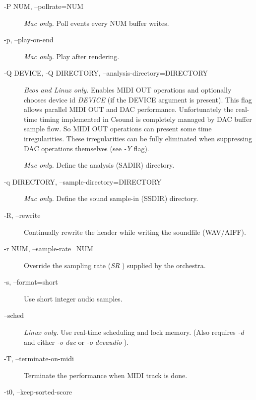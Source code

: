 \begin{description}
\item[-P NUM, --pollrate=NUM]

 \emph{Mac only.}
 Poll events every NUM buffer writes. 

\item[-p, --play-on-end]

 \emph{Mac only.}
 Play after rendering. 

\item[-Q DEVICE, -Q DIRECTORY, --analysis-directory=DIRECTORY]

 \emph{Beos and Linux only.}
 Enables MIDI OUT operations and optionally chooses device id \emph{DEVICE}
 (if the DEVICE argument is present). This flag allows parallel MIDI OUT and DAC performance. Unfortunately the real-time timing implemented in Csound is completely managed by DAC buffer sample flow. So MIDI OUT operations can present some time irregularities. These irregularities can be fully eliminated when suppressing DAC operations themselves (see \emph{-Y}
 flag). 


 \emph{Mac only.}
 Define the analysis (SADIR) directory. 

\item[-q DIRECTORY, --sample-directory=DIRECTORY]

 \emph{Mac only.}
 Define the sound sample-in (SSDIR) directory. 

\item[-R, --rewrite]

  Continually rewrite the header while writing the soundfile (WAV/AIFF). 

\item[-r NUM, --sample-rate=NUM]

  Override the sampling rate (\emph{SR}
) supplied by the orchestra. 

\item[-s, --format=short]

  Use short integer audio samples. 

\item[--sched]

 \emph{Linux only.}
 Use real-time scheduling and lock memory. (Also requires \emph{-d}
 and either \emph{-o dac}
 or \emph{-o devaudio}
). 

\item[-T, --terminate-on-midi]

  Terminate the performance when MIDI track is done. 

\item[-t0, --keep-sorted-score]


\end{description}
